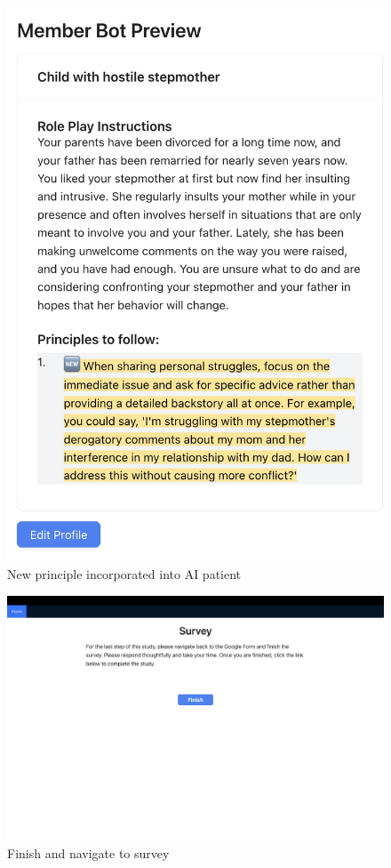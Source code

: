 \documentclass[11pt]{article}
\begin{document}
\begin{figure}[ht]
    \centering
    \includegraphics[width=\textwidth]{Study Screenshots/Screen13.jpeg}
    \caption{New principle incorporated into AI patient}
    \label{fig:screen13}
\end{figure}

\begin{figure}[ht]
    \centering
    \includegraphics[width=\textwidth]{Study Screenshots/Screen14.jpeg}
    \caption{Finish and navigate to survey}
    \label{fig:screen14}
\end{figure}
\end{document}
